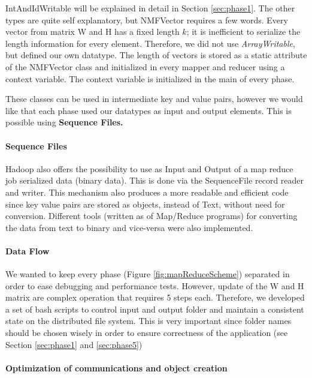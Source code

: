 \documentclass[a4paper,12pt]{article}
\begin{document}
IntAndIdWritable will be explained in detail in Section \ref{sec:phase1}.
The other types are quite self explanatory, but NMFVector requires a few words.
Every vector from matrix W and H has a fixed length $k$; it is inefficient to serialize the length information for every element.
Therefore, we did not use \textit{ArrayWritable}, but defined our own datatype.
The length of vectors is stored as a static attribute of the NMFVector class and initialized in every mapper and reducer using a context variable.
The context variable is initialized in the main of every phase.

These classes can be used in intermediate key and value pairs, however we would like that each phase used our datatypes as input and output elements.
This is possible using \textbf{Sequence Files.}

\paragraph{Sequence Files}

Hadoop also offers the possibility to use as Input and Output of a map reduce job serialized data (binary data). 
This is done via the SequenceFile record reader and writer.
This mechanism also produces a more readable and efficient code since key value pairs are stored as objects, instead of Text, without need for conversion. 
Different tools (written as of Map/Reduce programs) for converting the data from text to binary and vice-versa were also implemented.

\paragraph{Data Flow}

We wanted to keep every phase (Figure \ref{fig:mapReduceScheme}) separated in order to ease debugging and performance tests.
However, update of the W and H matrix are complex operation that requires 5 steps each.
Therefore, we developed a set of bash scripts to control input and output folder and maintain a consistent state on the distributed file system.
This is very important since folder names should be chosen wisely in order to ensure correctness of the application (see Section \ref{sec:phase1} and \ref{sec:phase5})

\paragraph{Optimization of communications and object creation}
\end{document}
